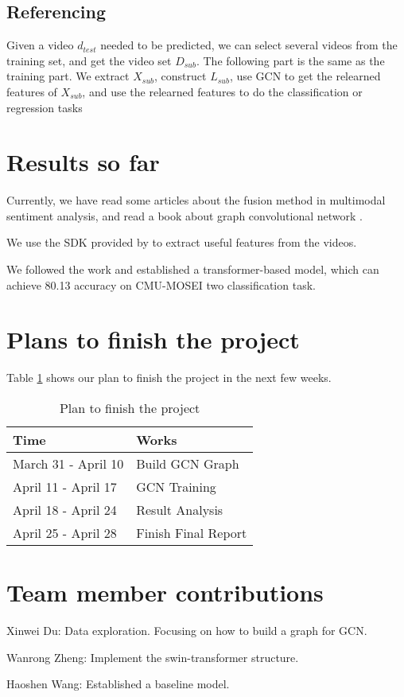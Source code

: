 \documentclass[11pt]{article}
\begin{document}
\subsection{Referencing}

Given a video $d_{test}$ needed to be predicted, we can select several videos from the training set, and get the video set $D_{sub}$. The following part is the same as the training part. We extract $X_{sub}$, construct $L_{sub}$, use GCN to get the relearned features of $X_{sub}$, and use the relearned features to do the classification or regression tasks


\section{Results so far}
Currently, we have read some articles about the fusion method in multimodal sentiment analysis, and read a book about graph convolutional network \cite{hamilton2020graph}.

We use the SDK provided by \cite{zadeh2018multimodal} to extract useful features from the videos.

We followed the work \cite{delbrouck2020transformer} and established a transformer-based model, which can achieve 80.13 accuracy on CMU-MOSEI two classification task.


\section{Plans to finish the project}

Table \ref{plan} shows our plan to finish the project in the next few weeks.

\begin{table}[]
\begin{tabular}{|l|l|}
\hline
\textbf{Time}       & \textbf{Works}               \\ \hline
March 31 - April 10 & Build GCN Graph     \\ \hline
April 11 - April 17 & GCN Training        \\ \hline
April 18 - April 24 & Result Analysis     \\ \hline
April 25 - April 28 & Finish Final Report \\ \hline
\end{tabular}
\caption{\label{plan} Plan to finish the project }
\end{table}

\section{Team member contributions}

\quad Xinwei Du: Data exploration. Focusing on how to build a graph for GCN.

Wanrong Zheng:  Implement the swin-transformer structure.

Haoshen Wang: Established a baseline model.



\end{document}
